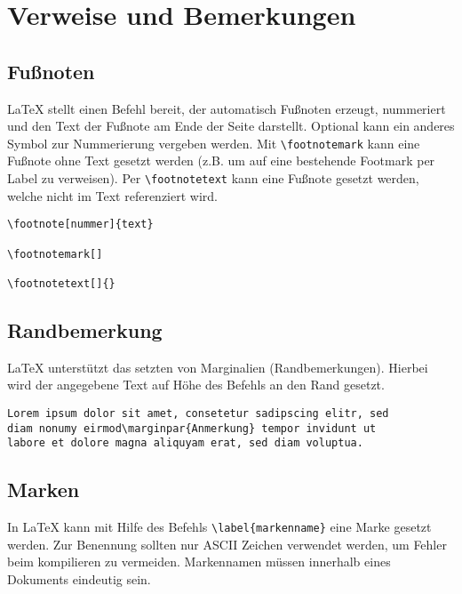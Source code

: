 \chapter{Verweise und Bemerkungen}
\section{Fußnoten}
\LaTeX{} stellt einen Befehl bereit, der automatisch Fußnoten erzeugt, nummeriert und den Text der Fußnote am Ende der Seite darstellt. Optional kann ein anderes Symbol zur Nummerierung vergeben werden. Mit \verb=\footnotemark= kann eine Fußnote ohne Text gesetzt werden (z.B. um auf eine bestehende Footmark per Label zu verweisen). Per \verb=\footnotetext= kann eine Fußnote gesetzt werden, welche nicht im Text referenziert wird.
\begin{lstlisting}[caption={Fußnoten (Befehle)}]
\footnote[nummer]{text}

\footnotemark[]

\footnotetext[]{}
\end{lstlisting}
\section{Randbemerkung}
\LaTeX{} unterstützt das setzten von Marginalien (Randbemerkungen). Hierbei wird der angegebene Text auf Höhe des Befehls an den Rand gesetzt.
\begin{lstlisting}[caption={Randbemerkung (Befehle)}]
Lorem ipsum dolor sit amet, consetetur sadipscing elitr, sed
diam nonumy eirmod\marginpar{Anmerkung} tempor invidunt ut
labore et dolore magna aliquyam erat, sed diam voluptua.
\end{lstlisting}
\section{Marken}
In \LaTeX{} kann mit Hilfe des Befehls \verb=\label{markenname}= eine Marke gesetzt werden. Zur Benennung sollten nur ASCII Zeichen verwendet werden, um Fehler beim kompilieren zu vermeiden. Markennamen müssen innerhalb eines Dokuments eindeutig sein.
\newpage
